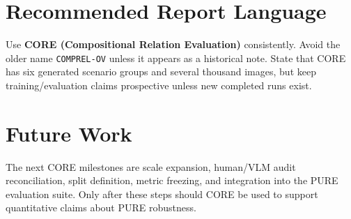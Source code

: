 \documentclass[11pt]{article}
\begin{document}
\section{Recommended Report Language}
Use \textbf{CORE (Compositional Relation Evaluation)} consistently. Avoid the older name \texttt{COMPREL-OV} unless it appears as a historical note. State that CORE has six generated scenario groups and several thousand images, but keep training/evaluation claims prospective unless new completed runs exist.

\section{Future Work}
The next CORE milestones are scale expansion, human/VLM audit reconciliation, split definition, metric freezing, and integration into the PURE evaluation suite. Only after these steps should CORE be used to support quantitative claims about PURE robustness.



\end{document}
